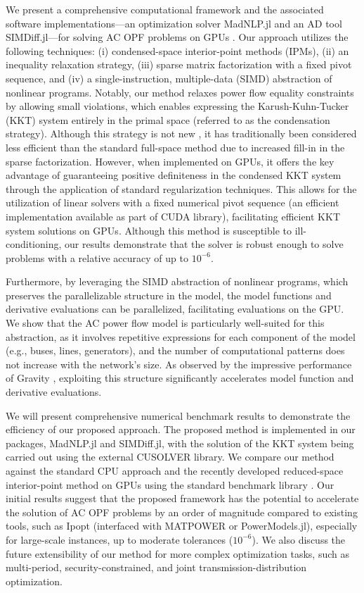 We present a comprehensive computational framework and the associated software implementations---an optimization solver MadNLP.jl and an AD tool SIMDiff.jl---for solving AC OPF problems on GPUs \cite{madnlp, simdiff}. Our approach utilizes the following techniques: (i) condensed-space interior-point methods (IPMs), (ii) an inequality relaxation strategy, (iii) sparse matrix factorization with a fixed pivot sequence, and (iv) a single-instruction, multiple-data (SIMD) abstraction of nonlinear programs. Notably, our method relaxes power flow equality constraints by allowing small violations, which enables expressing the Karush-Kuhn-Tucker (KKT) system entirely in the primal space (referred to as the condensation strategy). Although this strategy is not new \cite{nocedal2006numerical}, it has traditionally been considered less efficient than the standard full-space method due to increased fill-in in the sparse factorization. However, when implemented on GPUs, it offers the key advantage of guaranteeing positive definiteness in the condensed KKT system through the application of standard regularization techniques. This allows for the utilization of linear solvers with a fixed numerical pivot sequence (an efficient implementation available as part of CUDA library), facilitating efficient KKT system solutions on GPUs. Although this method is susceptible to ill-conditioning, our results demonstrate that the solver is robust enough to solve problems with a relative accuracy of up to $10^{-6}$.

Furthermore, by leveraging the SIMD abstraction of nonlinear programs, which preserves the parallelizable structure in the model, the model functions and derivative evaluations can be parallelized, facilitating evaluations on the GPU. We show that the AC power flow model is particularly well-suited for this abstraction, as it involves repetitive expressions for each component of the model (e.g., buses, lines, generators), and the number of computational patterns does not increase with the network's size. As observed by the impressive performance of Gravity \cite{hijazi2018gravity}, exploiting this structure significantly accelerates model function and derivative evaluations.

We will present comprehensive numerical benchmark results to demonstrate the efficiency of our proposed approach. The proposed method is implemented in our packages, MadNLP.jl and SIMDiff.jl, with the solution of the KKT system being carried out using the external CUSOLVER library. We compare our method against the standard CPU approach \cite{wachter2006implementation} and the recently developed reduced-space interior-point method on GPUs \cite{pacaud2022condensed} using the standard benchmark library \cite{pglib}. Our initial results suggest that the proposed framework has the potential to accelerate the solution of AC OPF problems by an order of magnitude compared to existing tools, such as Ipopt (interfaced with MATPOWER or PowerModels.jl), especially for large-scale instances, up to moderate tolerances ($10^{-6}$). We also discuss the future extensibility of our method for more complex optimization tasks, such as multi-period, security-constrained, and joint transmission-distribution optimization.

\pagebreak






 